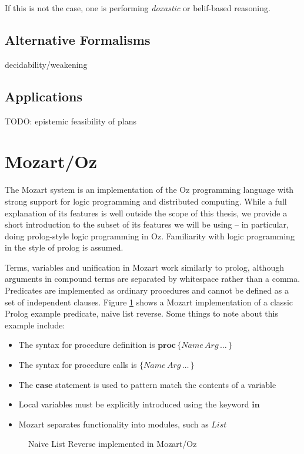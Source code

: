 If this is not the case, one is performing \emph{doxastic} or belif-based
reasoning.


\subsection{Alternative Formalisms }

decidability/weakening \citep{demolombe00tractable_sc_belief} \citep{petrick02knowledge_equivalence}


\subsection{Applications}

TODO: epistemic feasibility of plans \citep{giacomo04sem_delib_indigolog,Lesperance01epi_feas_casl}


\section{Mozart/Oz\label{sec:Background:Mozart/Oz}}

The Mozart system \citep{vanroy99mozart} is an implementation of
the Oz programming language \citep{vanRoyHaridi04ctm} with strong
support for logic programming and distributed computing. While a full
explanation of its features is well outside the scope of this thesis,
we provide a short introduction to the subset of its features we will
be using -- in particular, doing prolog-style logic programming in
Oz. Familiarity with logic programming in the style of prolog is assumed.

Terms, variables and unification in Mozart work similarly to prolog,
although arguments in compound terms are separated by whitespace rather
than a comma. Predicates are implemented as ordinary procedures and
cannot be defined as a set of independent clauses. Figure \ref{fig:Background:Naive-List-Reverse}
shows a Mozart implementation of a classic Prolog example predicate,
naive list reverse. Some things to note about this example include:

\begin{itemize}
\item The syntax for procedure definition is $\mathbf{proc}\,\{Name\, Arg\,\dots\,\}$ 
\item The syntax for procedure calls is $\{Name\, Arg\,\dots\,\}$ 
\item The $\mathbf{case}$ statement is used to pattern match the contents
of a variable 
\item Local variables must be explicitly introduced using the keyword $\mathbf{in}$ 
\item Mozart separates functionality into modules, such as $List$ 
\end{itemize}
%
\begin{figure}[t]

\caption{Naive List Reverse implemented in Mozart/Oz\label{fig:Background:Naive-List-Reverse}}

\end{figure}


